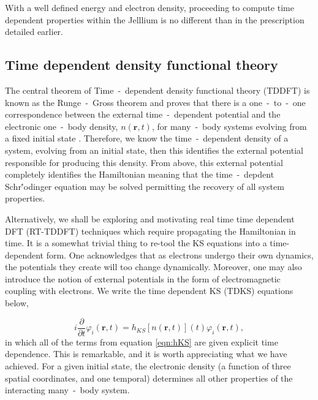With a well defined energy and electron density, proceeding to compute time dependent properties within the Jelllium is no different than in the prescription detailed earlier. 

\subsection{Time dependent density functional theory}
\label{sec:RTTDDFT}

The central theorem of Time~-~dependent density functional theory (TDDFT) is known as the Runge~-~Gross theorem \cite{PhysRevLett.52.997} and proves that there is a one~-~to~-~one correspondence between the external time~-~dependent potential and the electronic one~-~body density, $n(\textbf{r},t)$, for many~-~body systems evolving from a fixed initial state \cite{TDDFT_Fun_Book}. Therefore, we know the time~-~dependent density of a system, evolving from an initial state, then this identifies the external potential responsible for producing this density. From above, this external potential completely identifies the Hamiltonian meaning that the time~-~depdent Schr\''{o}dinger equation may be solved permitting the recovery of all system properties.

Alternatively, we shall be exploring and motivating real time time dependent DFT (RT-TDDFT) techniques which require propagating the Hamiltonian in time. It is a somewhat trivial thing to re-tool the KS equations into a time-dependent form. One acknowledges that as electrons undergo their own dynamics, the potentials they create will too change dynamically. Moreover, one may also introduce the notion of external potentials in the form of electromagnetic coupling with electrons. We write the time dependent KS (TDKS) equations below,

\begin{equation}
    i \frac{\partial}{\partial t} \varphi_{i}(\textbf{r},t) = h_{KS}[n(\textbf{r},t)](t)\varphi_{i}(\textbf{r},t),
    \label{eqn:TDKS}
\end{equation}
in which all of the terms from equation \ref{eqn:hKS} are given explicit time dependence. This is remarkable, and it is worth appreciating what we have achieved. For a given initial state, the electronic density (a function of three spatial coordinates, and one temporal) determines all other properties of the interacting many~-~body system.

